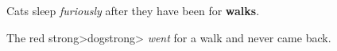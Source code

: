 \documentclass[11pt]{article}
\begin{document}
    
Cats sleep \textit{furiously} after they have been for \textbf{walks}.

    
The red strong>dogstrong> \textit{went} for a walk and never came back.
\end{document}

